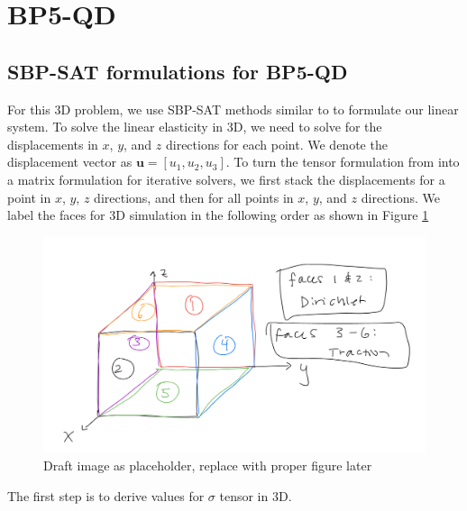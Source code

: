 \section{BP5-QD}
\subsection{SBP-SAT formulations for BP5-QD}
For this 3D problem, we use SBP-SAT methods similar to \cite{ALMQUIST2021109842} to formulate our linear system.
To solve the linear elasticity in 3D, we need to solve for the displacements in $x$, $y$, and $z$ directions for each point.
We denote the displacement vector as $\boldsymbol{u} = [u_1, u_2, u_3]$.
To turn the tensor formulation from \cite{ALMQUIST2021109842} into a matrix formulation for iterative solvers,  we first stack the displacements for a point in $x$, $y$, $z$ directions, and then for all points in $x$, $y$, and $z$ directions.
We label the faces for 3D simulation in the following order as shown in Figure \ref{fig:3d_problem}

\begin{figure}
    \centering
    \includegraphics[width=\linewidth]{figures/3D_problem.png}
    \caption{Draft image as placeholder, replace with proper figure later}
    \label{fig:3d_problem}
\end{figure}

The first step is to derive values for $\sigma$ tensor in 3D.

